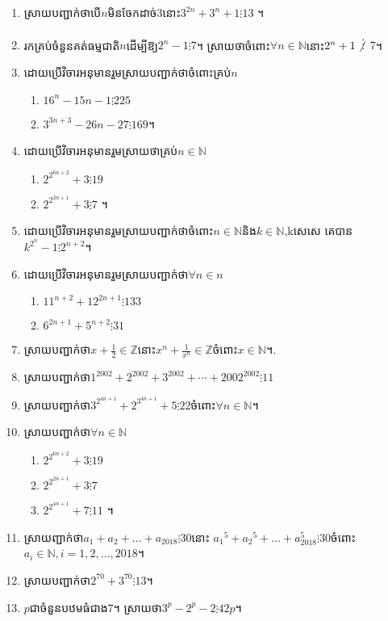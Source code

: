 \documentclass[a4paper,12pt]{book}
\newcommand{\N}{\mathbb{N}}
\newcommand{\Z}{\mathbb{Z}}
\begin{document}
\begin{enumerate}[1]
\item ស្រាយបញ្ជាក់ថាបើ$n$មិនចែកដាច់$3$នោះ$3^{2n}+3^n+1 \vdots 13$ ។
\item រកគ្រប់ចំនួនគត់ធម្មជាតិ$n$ដើម្បីឱ្យ$2^n-1 \vdots 7$។ ស្រាយថាចំពោះ$\forall n \in{\N}$នោះ$2^n+1\not \vdots$  $7$។
\item ដោយប្រើវិចារអនុមានរួម​ស្រាយបញ្ជាក់ថាចំពោះគ្រប់$n$
\begin{enumerate}[a]
\item $16^n-15n-1 \vdots 225$
\item $3^{3n+3}-26n-27 \vdots 169$។
\end{enumerate}
\item ដោយប្រើវិចារអនុមានរួមស្រាយថាគ្រប់$n\in{\N}$
\begin{enumerate}[a]
\item $2^{2^{6n+2}}+3\vdots 19$
\item $2^{2^{2n+1}}+3 \vdots 7$  ។
\end{enumerate}
\item ដោយប្រើវិចារអនុមានរួមស្រាយបញ្ជាក់ថាចំពោះ$n\in{\N}$និង$k\in{\N}$,kសេសេ  គេបាន$k^{2^{n}}-1\vdots 2^{n+2}$។
\item ដោយប្រើវិចារអនុមានរួមស្រាយបញ្ជាក់ថា$\forall n \in n$
\begin{enumerate}[a]
\item $11^{n+2}+12^{2n+1}\vdots 133$
\item $6^{2n+1}+5^{n+2}\vdots 31$
\end{enumerate}
\item ស្រាយបញ្ជាក់ថា$x+\frac{1}{2}\in{\Z}$នោះ$x^n+\frac{1}{x^n}\in{\Z}$ចំពោះ$x\in{\N}$។. 
\item ស្រាយបញ្ជាក់ថា$1^{2002}+2^{2002}+3^{2002}+\cdots+2002^{2002} \vdots 11$
\item ស្រាយបញ្ជាក់ថា$3^{2^{4n+1}}+2^{3^{4n+1}}+5 \vdots 22$ចំពោះ$\forall n \in {\N}$។
\item ស្រាយបញ្ជាក់ថា$\forall n \in{\N}$
\begin{enumerate}[a]
\item $2^{2^{6n+2}}+3 \vdots 19$
\item $2^{2^{2n+1}}+3 \vdots 7$
\item $2^{2^{4n+1}}+7 \vdots 11$ ។
\end{enumerate}
\item ស្រាយញ្ជាក់ថា$a_1+a_2+...+a_{2018} \vdots 30$នោះ
${a_1}^5+{a_2}^5+...+a_{2018}^5 \vdots 30$ចំពោះ${a_i}\in{\N} ,i=1,2,...,2018$។
\item ស្រាយបញ្ជាក់ថា$2^{70}+3^{70} \vdots 13$។
\item $p$ជាចំនួនបឋមធំជាង$7$។ ស្រាយថា$3^p-2^p-2 \vdots 42p$។

\end{enumerate}
\end{document}
